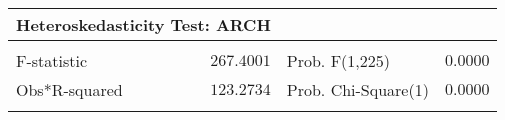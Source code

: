 \begin{tabular}{lrrrr}
\toprule
\multicolumn{2}{l}{Heteroskedasticity Test: ARCH}&\multicolumn{1}{c}{}&\multicolumn{1}{c}{}&\multicolumn{1}{c}{}\\
[4.5pt] \hline \\ [-4.5pt]
\multicolumn{1}{l}{F-statistic}&\multicolumn{1}{r}{$267.4001$}&\multicolumn{2}{l}{Prob. F(1,225)}&\multicolumn{1}{r}{$0.0000$}\\
\multicolumn{1}{l}{Obs*R-squared}&\multicolumn{1}{r}{$123.2734$}&\multicolumn{2}{l}{Prob. Chi-Square(1)}&\multicolumn{1}{r}{$0.0000$}\\
[4.5pt] \bottomrule \\ [-4.5pt]
\end{tabular}
